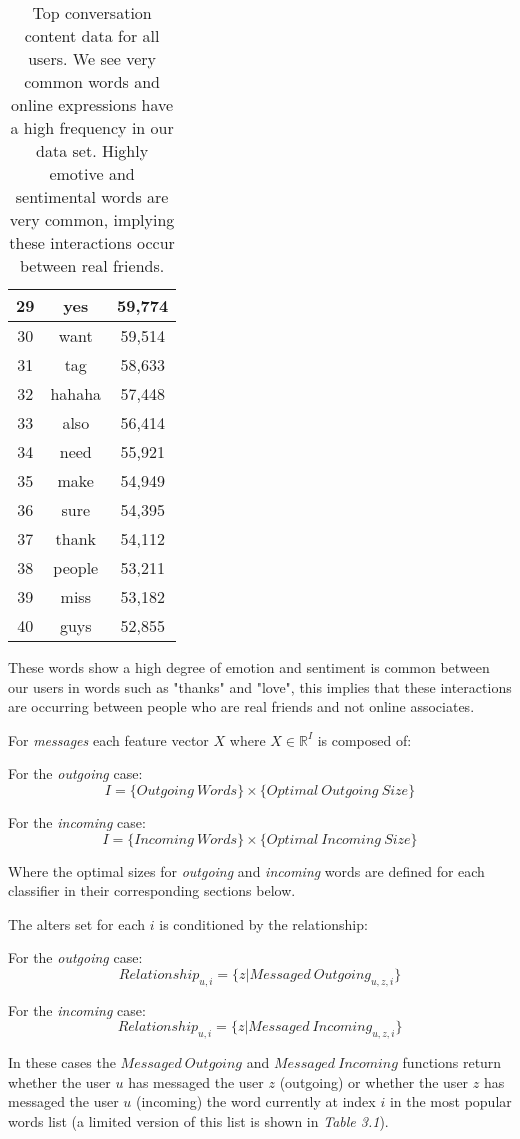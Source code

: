 \begin{table}[!htbp]
\begin{minipage}[b]{.5\textwidth}
\begin{tabular}{|c|c|c|}
		29 & yes & 59,774 \\ \hline
		30 & want & 59,514 \\ \hline
		31 & tag & 58,633 \\ \hline
		32 & hahaha & 57,448 \\ \hline
		33 & also & 56,414 \\ \hline
		34 & need & 55,921 \\ \hline
		35 & make & 54,949 \\ \hline
		36 & sure & 54,395 \\ \hline
		37 & thank & 54,112 \\ \hline
		38 & people & 53,211 \\ \hline
		39 & miss & 53,182 \\ \hline
		40 & guys & 52,855 \\ \hline
	\end{tabular}
\end{minipage}
	\caption{Top conversation content data for all users. We see very common words and online expressions have a high frequency in
	our data set. Highly emotive and sentimental words are very common, implying these interactions occur between real friends.}
	\label{tab:revpol}
\end{table}

These words show a high degree of emotion and sentiment is common between our users in words such as "thanks" and "love", 
this implies that these interactions are occurring between people who are real friends and not online associates.

For \emph{messages} each feature vector $X$ where $X \in \mathbb{R}^I$ is composed of:

For the \emph{outgoing} case:
\[ I = \{Outgoing \ Words\} \times \{Optimal \ Outgoing \ Size\} \]

For the \emph{incoming} case:
\[ I = \{Incoming \ Words\} \times \{Optimal \ Incoming \ Size\} \]

Where the optimal sizes for \emph{outgoing} and \emph{incoming} words are defined for each classifier in their corresponding sections below.

The alters set for each $i$ is conditioned by the relationship:

For the \emph{outgoing} case:
\[ Relationship_{u,i} = \{z | Messaged \ Outgoing_{u,z,i}\} \]

For the \emph{incoming} case:
\[ Relationship_{u,i} = \{z | Messaged \ Incoming_{u,z,i}\} \]

In these cases the $Messaged \ Outgoing$ and $Messaged \ Incoming$ functions return whether the user $u$ has messaged the user $z$ (outgoing) 
or whether the user $z$ has messaged the user $u$ (incoming) the word currently at index $i$ in the most popular words list (a limited version of this list is shown in \emph{Table 3.1}).

